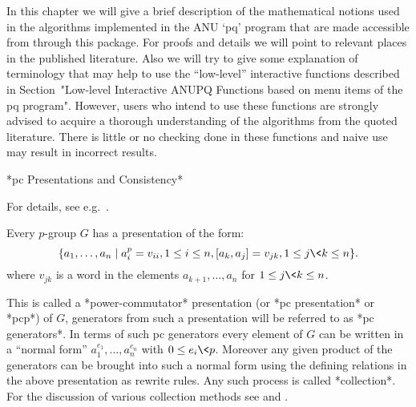 

In this chapter  we will give a brief  description of the mathematical
notions used  in the  algorithms implemented in  the ANU  `pq' program
that are made accessible from  {\GAP} through this package. For proofs
and  details  we  will  point  to relevant  places  in  the  published
literature. Also we  will try to give some  explanation of terminology
that may help to use the ``low-level'' interactive functions described
in Section~"Low-level Interactive ANUPQ  Functions based on menu items
of the pq program".  However,  users who intend to use these functions
are  strongly  advised to  acquire  a  thorough  understanding of  the
algorithms from the quoted literature.  There is little or no checking
done in these functions and naive use may result in incorrect results.


*pc Presentations and Consistency*

For details, see e.g.~\cite{NNN98}.

Every $p$-group $G$ has a presentation of the form: 
$$
\{a_1,\dots,a_n \mid a_i^p = v_{ii}, 1 \le i \le n, 
               [a_k, a_j] = v_{jk}, 1 \le j \< k \le n \}.  
$$
where $v_{jk}$ is a word in the elements $a_{k+1},\dots,a_n$ for 
$1 \le j \< k \le n$.

This is called a *power-commutator* presentation (or *pc presentation*
or *pcp*) of $G$, generators from such a presentation will be referred
to as *pc generators*. In terms of such pc generators every element of
$G$ can  be written  in a ``normal  form'' $a_1^{e_1},\dots,a_n^{e_n}$
with $0  \le e_i \< p$.  Moreover any given product  of the generators
can be brought into such a normal form using the defining relations in
the above presentation  as rewrite rules.  Any such  process is called
*collection*.  For the  discussion of  various collection  methods see
\cite{LGS90} and \cite{VL90a}.

